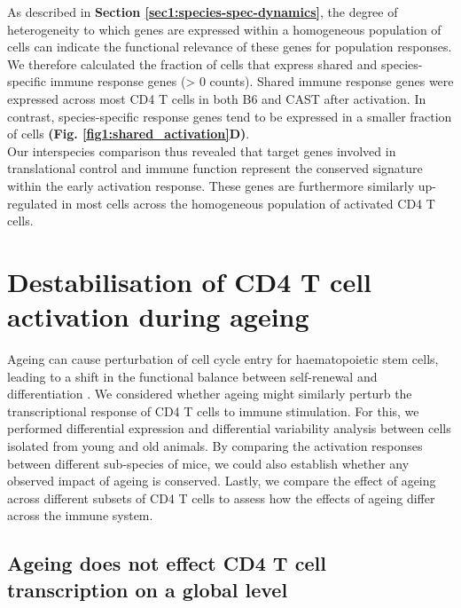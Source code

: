 As described in \textbf{Section \ref{sec1:species-spec-dynamics}}, the degree of heterogeneity to which genes are expressed within a homogeneous population of cells can indicate the functional relevance of these genes for population responses. 
We therefore calculated the fraction of cells that express shared and species-specific immune response genes (> 0 counts). 
Shared immune response genes were expressed across most CD4\plus{} T cells in both B6 and CAST after activation. 
In contrast, species-specific response genes tend to be expressed in a smaller fraction of cells \textbf{(Fig. \ref{fig1:shared_activation}D)}. \\

Our interspecies comparison thus revealed that target genes involved in translational control and immune function represent the conserved signature within the early activation response. 
These genes are furthermore similarly up-regulated in most cells across the homogeneous population of activated CD4\plus{} T cells. 

\newpage

\section{Destabilisation of CD4\plus{} T cell activation during ageing}

Ageing can cause perturbation of cell cycle entry for haematopoietic stem cells, leading to a shift in the functional balance between self-renewal and differentiation \citep{Kowalczyk2015}. 
We considered whether ageing might similarly perturb the transcriptional response of CD4\plus{} T cells to immune stimulation. 
For this, we performed differential expression and differential variability analysis between cells isolated from young and old animals. 
By comparing the activation responses between different sub-species of mice, we could also establish whether any observed impact of ageing is conserved. 
Lastly, we compare the effect of ageing across different subsets of CD4\plus{} T cells to assess how the effects of ageing differ across the immune system.

\subsection{Ageing does not effect CD4\plus{} T cell transcription on a global level}
\label{sec1:global_changes}

